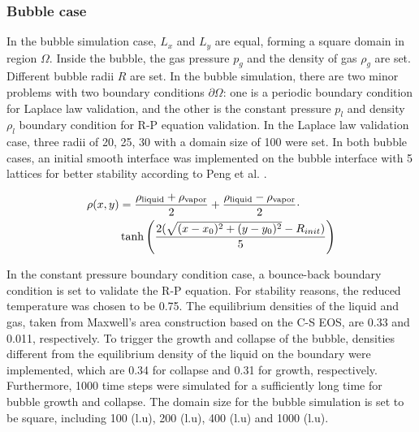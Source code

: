 \documentclass[review]{elsarticle}
\begin{document}
\subsubsection{Bubble case}
In the bubble simulation case, $L_x$ and $L_y$ are equal, forming a square domain in region $\Omega$. Inside the bubble, the gas pressure $p_g$ and the density of gas $\rho_g$ are set. Different bubble radii $R$ are set. In the bubble simulation, there are two minor problems with two boundary conditions $\partial \Omega$: one is a periodic boundary condition for Laplace law validation, and the other is the constant pressure $p_l$ and density $\rho_l$ boundary condition for R-P equation validation. In the Laplace law validation case, three radii of 20, 25, 30 with a domain size of 100 were set. In both bubble cases, an initial smooth interface was implemented on the bubble interface with 5 lattices for better stability according to Peng et al. \cite{peng2019simulation}.
\begin{linenomath*}
	\begin{align}
		\rho(x,y)&=\frac{\rho_{\text{liquid}}+\rho_{\text{vapor}}}{2}+\frac{\rho_{\text{liquid}}-\rho_{\text{vapor}}}{2} \cdot\notag \\
		&\tanh\left(\frac{2(\sqrt{(x-x_{0})^{2}+(y-y_{0})^{2}}-R_{init})}{5}\right)
	\end{align}
	\label{equ:smooth2}
\end{linenomath*}

In the constant pressure boundary condition case, a bounce-back boundary condition is set to validate the R-P equation. For stability reasons, the reduced temperature was chosen to be 0.75. The equilibrium densities of the liquid and gas, taken from Maxwell's area construction based on the C-S EOS, are 0.33 and 0.011, respectively. To trigger the growth and collapse of the bubble, densities different from the equilibrium density of the liquid on the boundary were implemented, which are 0.34 for collapse and 0.31 for growth, respectively. Furthermore, 1000 time steps were simulated for a sufficiently long time for bubble growth and collapse. The domain size for the bubble simulation is set to be square, including 100 (l.u), 200 (l.u), 400 (l.u) and 1000 (l.u).
\end{document}
